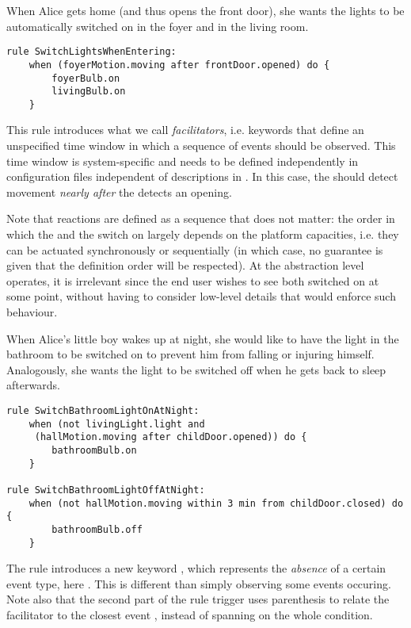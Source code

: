 \begin{description}[leftmargin=0cm]
	\item[Switching entrance lights on when coming in]  When Alice gets home (and thus opens the front door), she wants the lights to be automatically switched on in the foyer and in the living room.
	\begin{lstlisting}[language=iotdsl,
							label=lis:home-rule,
		caption=Rule to switch on the lights at home incoming]
rule SwitchLightsWhenEntering:
	when (foyerMotion.moving after frontDoor.opened) do {
		foyerBulb.on
		livingBulb.on
	}
	\end{lstlisting}
	This rule introduces what we call \emph{facilitators}, i.e. keywords that define an unspecified time window in which a sequence of events should be observed. This time window is system-specific and needs to be defined independently in configuration files independent of descriptions in \IOTDSL. In this case, the  should detect movement \emph{nearly after} the  detects an opening. 
		
	Note that reactions are defined as a sequence that does not matter: the order in which the  and the  switch on largely depends on the platform capacities, i.e. they can be actuated synchronously or sequentially (in which case, no guarantee is given that the definition order will be respected). At the abstraction level \IOTDSL operates, it is irrelevant since the end user wishes to see both switched on at some point, without having to consider low-level details that would enforce such behaviour.

	\item[Illuminate bathroom when children wake up at night] When Alice's little boy wakes up at night, she would like to have the light in the bathroom to be switched on to prevent him from falling or injuring himself. Analogously, she wants the light to be switched off when he gets back to sleep afterwards.
	\begin{lstlisting}[language=iotdsl,
							label=lis:night-rule,
		caption=Rules to switch on\//off lights in the corridor at night]
rule SwitchBathroomLightOnAtNight:	
	when (not livingLight.light and 
	 (hallMotion.moving after childDoor.opened)) do {
		bathroomBulb.on
	}

rule SwitchBathroomLightOffAtNight:	
	when (not hallMotion.moving within 3 min from childDoor.closed) do {
		bathroomBulb.off
	}
	\end{lstlisting}
	The rule  introduces a new keyword , which represents the \emph{absence} of a certain event type, here . This is different than simply observing some events occuring. Note also that the second part of the rule trigger uses parenthesis to relate the facilitator  to the closest event , instead of spanning on the whole condition.


\end{description}
